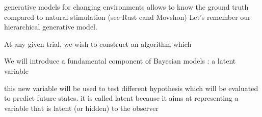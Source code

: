 \documentclass[12pt,english]{article}%
\newcommand{\citep}[1]{\parencite{#1}}
\newcommand{\citet}[1]{\textcite{#1}}
\begin{document}
%
%

generative models for changing environments allows to know the ground truth compared to natural stimulation (see Rust eand Movshon)%
Let's remember our hierarchical generative model.

At any given trial, we wish to construct an algorithm which

We will introduce a fundamental component of Bayesian models : a latent variable

this new variable will be used to test different hypothesis which will be evaluated to predict future states. it is called latent because it aims at representing a variable that is latent (or hidden) to the observer
\end{document}
